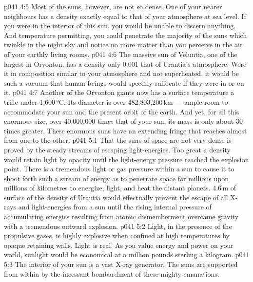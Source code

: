 \vs p041 4:5 Most of the suns, however, are not so dense. One of your nearer neighbours has a density exactly equal to that of your atmosphere at sea level. If you were in the interior of this sun, you would be unable to discern anything. And temperature permitting, you could penetrate the majority of the suns which twinkle in the night sky and notice no more matter than you perceive in the air of your earthly living rooms.
\vs p041 4:6 The massive sun of Veluntia, one of the largest in Orvonton, has a density only 0.001 that of Urantia’s atmosphere. Were it in composition similar to your atmosphere and not superheated, it would be such a vacuum that human beings would speedily suffocate if they were in or on it.
\vs p041 4:7 Another of the Orvonton giants now has a surface temperature a trifle under 1,600\,°C. Its diameter is over 482,803,200\,km --- ample room to accommodate your sun and the present orbit of the earth. And yet, for all this enormous size, over 40,000,000 times that of your sun, its mass is only about 30 times greater. These enormous suns have an extending fringe that reaches almost from one to the other.
\vs p041 5:1 That the suns of space are not very dense is proved by the steady streams of escaping light\hyp{}energies. Too great a density would retain light by opacity until the light\hyp{}energy pressure reached the explosion point. There is a tremendous light or gas pressure within a sun to cause it to shoot forth such a stream of energy as to penetrate space for millions upon millions of kilometres to energize, light, and heat the distant planets. 4.6\,m of surface of the density of Urantia would effectually prevent the escape of all X\hyp{}rays and light\hyp{}energies from a sun until the rising internal pressure of accumulating energies resulting from atomic dismemberment overcame gravity with a tremendous outward explosion.
\vs p041 5:2 Light, in the presence of the propulsive gases, is highly explosive when confined at high temperatures by opaque retaining walls. Light is real. As you value energy and power on your world, sunlight would be economical at a million pounds sterling a kilogram.
\vs p041 5:3 The interior of your sun is a vast X\hyp{}ray generator. The suns are supported from within by the incessant bombardment of these mighty emanations.
